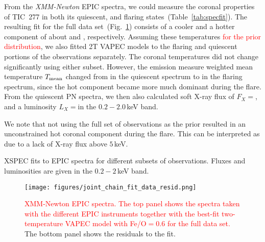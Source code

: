 \documentclass[twocolumn]{aastex631}
\begin{document}
From the \textit{XMM-Newton} EPIC spectra, we could measure the coronal properties of TIC~277 in both its quiescent, and flaring states~(Table~\ref{tab:specfit}). The resulting fit for the full data set~(Fig.~\ref{fig:spec_joint_all}) consists of a cooler and a hotter component of about \Tcool and \Thot\hspace{-.1cm}, respectively. Assuming these temperatures \textcolor{red}{for the prior distribution}, we also fitted 2T VAPEC models to the flaring and quiescent portions of the observations separately. The coronal temperatures did not change significantly using either subset. However, the emission measure weighted mean temperature $T_{\rm mean}$ changed from \Tqmean in the quiescent spectrum to \Tfmean in the flaring spectrum, since the hot component became more much dominant during the flare. From the quiescent PN spectra, we then also calculated soft X-ray flux of $F_X=$\FX, and a luminosity $L_X=$\LXquiet in the $0.2-2.0\,$keV band. %

We note that not using the full set of observations as the prior resulted in an unconstrained hot coronal component during the flare. This can be interpreted as due to a lack of X-ray flux above $5\,$keV. %


 \begin{table}
\footnotesize
\centering
    \caption{XSPEC fits to EPIC spectra for different subsets of observations. Fluxes and luminosities are given in the $0.2-2\,$keV band.}
    
        \label{tab:specfit}
\end{table}


\begin{figure}
    \begin{centering}
        \texttt{[image: figures/joint\_chain\_fit\_data\_resid.png]}
        \caption{
         \textcolor{red}{XMM-Newton EPIC spectra. The top panel shows the spectra taken with the different EPIC instruments together with the best-fit two-temperature VAPEC model with Fe/O$=0.6$ for the full data set.} The bottom panel shows the residuals to the fit.
        }
        \label{fig:spec_joint_all}
    \end{centering}
\end{figure}
\end{document}
